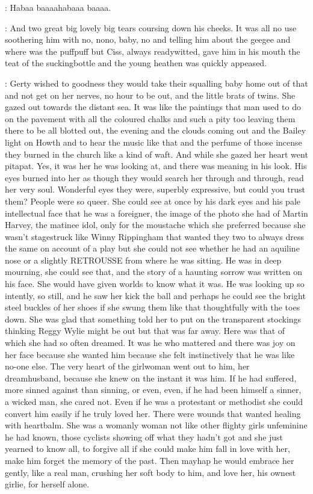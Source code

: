 \baby:
Habaa baaaahabaaa baaaa.

:
And two great big lovely big tears coursing down his cheeks. It was all no
use soothering him with no, nono, baby, no and telling him about the
geegee and where was the puffpuff but Ciss, always readywitted, gave him
in his mouth the teat of the suckingbottle and the young heathen was
quickly appeased.

:
Gerty wished to goodness they would take their squalling baby home out of
that and not get on her nerves, no hour to be out, and the little brats
of twins. She gazed out towards the distant sea. It was like the paintings
that man used to do on the pavement with all the coloured chalks and such
a pity too leaving them there to be all blotted out, the evening and the
clouds coming out and the Bailey light on Howth and to hear the music like
that and the perfume of those incense they burned in the church like a
kind of waft. And while she gazed her heart went pitapat. Yes, it was her
he was looking at, and there was meaning in his look. His eyes burned into
her as though they would search her through and through, read her very
soul. Wonderful eyes they were, superbly expressive, but could you trust
them? People were so queer. She could see at once by his dark eyes and his
pale intellectual face that he was a foreigner, the image of the photo she
had of Martin Harvey, the matinee idol, only for the moustache which she
preferred because she wasn't stagestruck like Winny Rippingham that
wanted they two to always dress the same on account of a play but she
could not see whether he had an aquiline nose or a slightly RETROUSSE from
where he was sitting. He was in deep mourning, she could see that, and the
story of a haunting sorrow was written on his face. She would have given
worlds to know what it was. He was looking up so intently, so still, and
he saw her kick the ball and perhaps he could see the bright steel buckles
of her shoes if she swung them like that thoughtfully with the toes down.
She was glad that something told her to put on the transparent stockings
thinking Reggy Wylie might be out but that was far away. Here was that of
which she had so often dreamed. It was he who mattered and there was joy
on her face because she wanted him because she felt instinctively that he
was like no-one else. The very heart of the girlwoman went out to him, her
dreamhusband, because she knew on the instant it was him. If he had
suffered, more sinned against than sinning, or even, even, if he had been
himself a sinner, a wicked man, she cared not. Even if he was a protestant
or methodist she could convert him easily if he truly loved her. There
were wounds that wanted healing with heartbalm. She was a womanly woman
not like other flighty girls unfeminine he had known, those cyclists
showing off what they hadn't got and she just yearned to know all, to
forgive all if she could make him fall in love with her, make him forget
the memory of the past. Then mayhap he would embrace her gently, like a
real man, crushing her soft body to him, and love her, his ownest girlie,
for herself alone.

